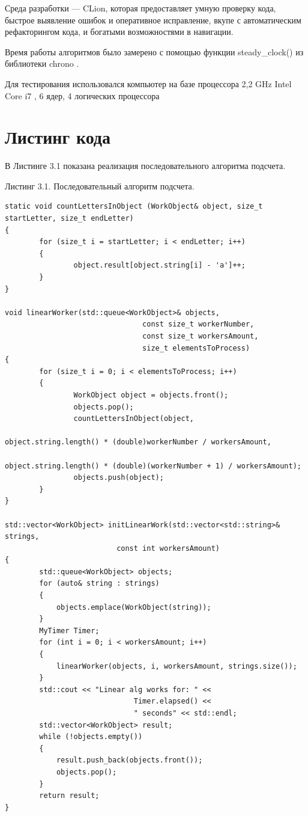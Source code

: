 \documentclass[12pt]{report}
\begin{document}
Среда разработки — CLion, которая предоставляет умную проверку кода, быстрое выявление ошибок и оперативное исправление, вкупе с автоматическим рефакторингом кода, и богатыми возможностями в навигации.  

Время работы алгоритмов было замерено с помощью функции steady\_clock() из библиотеки chrono \cite{chrono}. 

Для тестирования использовался компьютер на базе процессора 2,2 GHz Intel Core i7 \cite{intel}, 6 ядер, 4 логических процессора

\newpage
\section{Листинг кода}

В Листинге 3.1 показана реализация последовательного алгоритма подсчета.

\begin{flushleft}
Листинг 3.1. Последовательный алгоритм подсчета.
\begin{lstlisting}
static void countLettersInObject (WorkObject& object, size_t startLetter, size_t endLetter) 
{
		for (size_t i = startLetter; i < endLetter; i++) 
		{
				object.result[object.string[i] - 'a']++;
		}
}

void linearWorker(std::queue<WorkObject>& objects, 	
								const size_t workerNumber, 
								const size_t workersAmount, 
								size_t elementsToProcess) 
{
		for (size_t i = 0; i < elementsToProcess; i++) 
		{
				WorkObject object = objects.front();
				objects.pop();
				countLettersInObject(object,
													  object.string.length() * (double)workerNumber / workersAmount,
													  object.string.length() * (double)(workerNumber + 1) / workersAmount);
				objects.push(object);
		}
}

std::vector<WorkObject> initLinearWork(std::vector<std::string>& strings, 
						  const int workersAmount) 
{
		std::queue<WorkObject> objects;
		for (auto& string : strings) 
		{
			objects.emplace(WorkObject(string));
		}
		MyTimer Timer;
		for (int i = 0; i < workersAmount; i++) 
		{
			linearWorker(objects, i, workersAmount, strings.size());
		}
		std::cout << "Linear alg works for: " << 
							  Timer.elapsed() << 
							  " seconds" << std::endl;
		std::vector<WorkObject> result;
		while (!objects.empty()) 
		{
			result.push_back(objects.front());
			objects.pop();
		}
		return result;
}
\end{lstlisting}
\end{flushleft}
\end{document}
